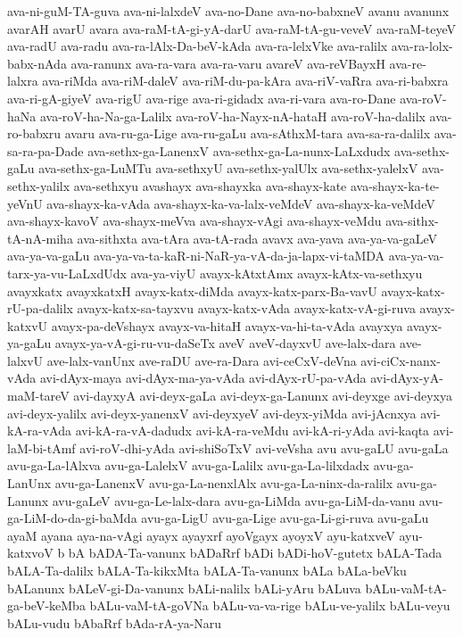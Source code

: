 {ava-ni-guM-TA-guva
ava-ni-lalxdeV
ava-no-Dane
ava-no-babxneV
avanu
avanunx
avarAH
avarU
avara
ava-raM-tA-gi-yA-darU
ava-raM-tA-gu-veveV
ava-raM-teyeV
ava-radU
ava-radu
ava-ra-lAlx-Da-beV-kAda
ava-ra-lelxVke
ava-ralilx
ava-ra-lolx-babx-nAda
ava-ranunx
ava-ra-vara
ava-ra-varu
avareV
ava-reVBayxH
ava-re-lalxra
ava-riMda
ava-riM-daleV
ava-riM-du-pa-kAra
ava-riV-vaRra
ava-ri-babxra
ava-ri-gA-giyeV
ava-rigU
ava-rige
ava-ri-gidadx
ava-ri-vara
ava-ro-Dane
ava-roV-haNa
ava-roV-ha-Na-ga-Lalilx
ava-roV-ha-Nayx-nA-hataH
ava-roV-ha-dalilx
ava-ro-babxru
avaru
ava-ru-ga-Lige
ava-ru-gaLu
ava-sAthxM-tara
ava-sa-ra-dalilx
ava-sa-ra-pa-Dade
ava-sethx-ga-LanenxV
ava-sethx-ga-La-nunx-LaLxdudx
ava-sethx-gaLu
ava-sethx-ga-LuMTu
ava-sethxyU
ava-sethx-yalUlx
ava-sethx-yalelxV
ava-sethx-yalilx
ava-sethxyu
avashayx
ava-shayxka
ava-shayx-kate
ava-shayx-ka-te-yeVnU
ava-shayx-ka-vAda
ava-shayx-ka-va-lalx-veMdeV
ava-shayx-ka-veMdeV
ava-shayx-kavoV
ava-shayx-meVva
ava-shayx-vAgi
ava-shayx-veMdu
ava-sithx-tA-nA-miha
ava-sithxta
ava-tAra
ava-tA-rada
avavx
ava-yava
ava-ya-va-gaLeV
ava-ya-va-gaLu
ava-ya-va-ta-kaR-ni-NaR-ya-vA-da-ja-lapx-vi-taMDA
ava-ya-va-tarx-ya-vu-LaLxdUdx
ava-ya-viyU
avayx-kAtxtAmx
avayx-kAtx-va-sethxyu
avayxkatx
avayxkatxH
avayx-katx-diMda
avayx-katx-parx-Ba-vavU
avayx-katx-rU-pa-dalilx
avayx-katx-sa-tayxvu
avayx-katx-vAda
avayx-katx-vA-gi-ruva
avayx-katxvU
avayx-pa-deVshayx
avayx-va-hitaH
avayx-va-hi-ta-vAda
avayxya
avayx-ya-gaLu
avayx-ya-vA-gi-ru-vu-daSeTx
aveV
aveV-dayxvU
ave-lalx-dara
ave-lalxvU
ave-lalx-vanUnx
ave-raDU
ave-ra-Dara
avi-ceCxV-deVna
avi-ciCx-nanx-vAda
avi-dAyx-maya
avi-dAyx-ma-ya-vAda
avi-dAyx-rU-pa-vAda
avi-dAyx-yA-maM-tareV
avi-dayxyA
avi-deyx-gaLa
avi-deyx-ga-Lanunx
avi-deyxge
avi-deyxya
avi-deyx-yalilx
avi-deyx-yanenxV
avi-deyxyeV
avi-deyx-yiMda
avi-jAcnxya
avi-kA-ra-vAda
avi-kA-ra-vA-dadudx
avi-kA-ra-veMdu
avi-kA-ri-yAda
avi-kaqta
avi-laM-bi-tAmf
avi-roV-dhi-yAda
avi-shiSoTxV
avi-veVsha
avu
avu-gaLU
avu-gaLa
avu-ga-La-lAlxva
avu-ga-LalelxV
avu-ga-Lalilx
avu-ga-La-lilxdadx
avu-ga-LanUnx
avu-ga-LanenxV
avu-ga-La-nenxlAlx
avu-ga-La-ninx-da-ralilx
avu-ga-Lanunx
avu-gaLeV
avu-ga-Le-lalx-dara
avu-ga-LiMda
avu-ga-LiM-da-vanu
avu-ga-LiM-do-da-gi-baMda
avu-ga-LigU
avu-ga-Lige
avu-ga-Li-gi-ruva
avu-gaLu
ayaM
ayana
aya-na-vAgi
ayayx
ayayxrf
ayoVgayx
ayoyxV
ayu-katxveV
ayu-katxvoV
b
bA
bADA-Ta-vanunx
bADaRrf
bADi
bADi-hoV-gutetx
bALA-Tada
bALA-Ta-dalilx
bALA-Ta-kikxMta
bALA-Ta-vanunx
bALa
bALa-beVku
bALanunx
bALeV-gi-Da-vanunx
bALi-nalilx
bALi-yAru
bALuva
bALu-vaM-tA-ga-beV-keMba
bALu-vaM-tA-goVNa
bALu-va-va-rige
bALu-ve-yalilx
bALu-veyu
bALu-vudu
bAbaRrf
bAda-rA-ya-Naru
}
